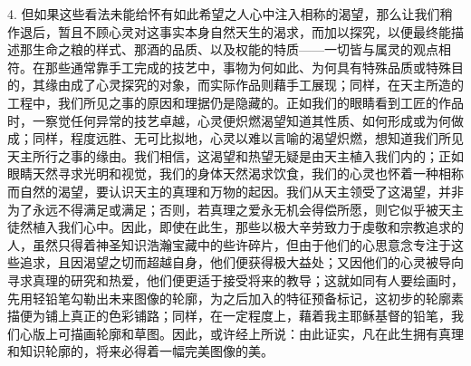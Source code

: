 4. 但如果这些看法未能给怀有如此希望之人心中注入相称的渴望，那么让我们稍作退后，暂且不顾心灵对这事实本身自然天生的渴求，而加以探究，以便最终能描述那生命之粮的样式、那酒的品质、以及权能的特质——一切皆与属灵的观点相符。在那些通常靠手工完成的技艺中，事物为何如此、为何具有特殊品质或特殊目的，其缘由成了心灵探究的对象，而实际作品则藉手工展现；同样，在天主所造的工程中，我们所见之事的原因和理据仍是隐藏的。正如我们的眼睛看到工匠的作品时，一察觉任何异常的技艺卓越，心灵便炽燃渴望知道其性质、如何形成或为何做成；同样，程度远胜、无可比拟地，心灵以难以言喻的渴望炽燃，想知道我们所见天主所行之事的缘由。我们相信，这渴望和热望无疑是由天主植入我们内的；正如眼睛天然寻求光明和视觉，我们的身体天然渴求饮食，我们的心灵也怀着一种相称而自然的渴望，要认识天主的真理和万物的起因。我们从天主领受了这渴望，并非为了永远不得满足或满足；否则，若真理之爱永无机会得偿所愿，则它似乎被天主徒然植入我们心中。因此，即使在此生，那些以极大辛劳致力于虔敬和宗教追求的人，虽然只得着神圣知识浩瀚宝藏中的些许碎片，但由于他们的心思意念专注于这些追求，且因渴望之切而超越自身，他们便获得极大益处；又因他们的心灵被导向寻求真理的研究和热爱，他们便更适于接受将来的教导；这就如同有人要绘画时，先用轻铅笔勾勒出未来图像的轮廓，为之后加入的特征预备标记，这初步的轮廓素描便为铺上真正的色彩铺路；同样，在一定程度上，藉着我主耶稣基督的铅笔，我们心版上可描画轮廓和草图。因此，或许经上所说：由此证实，凡在此生拥有真理和知识轮廓的，将来必得着一幅完美图像的美。\par


